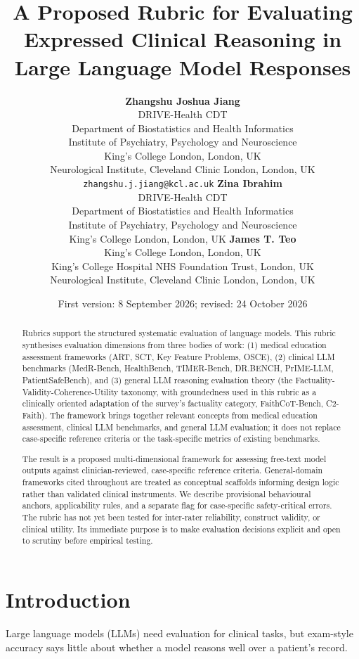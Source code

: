 \documentclass{article}
\title{A Proposed Rubric for Evaluating Expressed Clinical Reasoning in Large Language Model Responses}
\author{%
  {\normalfont\textbf{Zhangshu Joshua Jiang}}\\[-1pt]
  {\normalfont\small
  DRIVE-Health CDT\\
  Department of Biostatistics and Health Informatics\\
  Institute of Psychiatry, Psychology and Neuroscience\\
  King's College London, London, UK\\
  Neurological Institute, Cleveland Clinic London, London, UK\\
  \texttt{zhangshu.j.jiang@kcl.ac.uk}}
  \And
  {\normalfont\textbf{Zina Ibrahim}}\\[-1pt]
  {\normalfont\small
  DRIVE-Health CDT\\
  Department of Biostatistics and Health Informatics\\
  Institute of Psychiatry, Psychology and Neuroscience\\
  King's College London, London, UK}
  \And
  {\normalfont\textbf{James T. Teo}}\\[-1pt]
  {\normalfont\small
  King's College London, London, UK\\
  King's College Hospital NHS Foundation Trust, London, UK\\
  Neurological Institute, Cleveland Clinic London, London, UK}
}
\date{First version: 8 September 2026; revised: 24 October 2026}
\begin{document}
\maketitle

\begin{abstract}
Rubrics support the structured systematic evaluation of language models. This rubric synthesises evaluation dimensions from three bodies of work: (1) medical education assessment frameworks (ART, SCT, Key Feature Problems, OSCE), (2) clinical LLM benchmarks (MedR-Bench, HealthBench, TIMER-Bench, DR.BENCH, PrIME-LLM, PatientSafeBench), and (3) general LLM reasoning evaluation theory (the Factuality-Validity-Coherence-Utility taxonomy, with groundedness used in this rubric as a clinically oriented adaptation of the survey's factuality category, FaithCoT-Bench, C2-Faith). The framework brings together relevant concepts from medical education
assessment, clinical LLM benchmarks, and general LLM evaluation; it does not replace case-specific reference criteria or the task-specific metrics
of existing benchmarks.  

The result is a proposed multi-dimensional framework for assessing free-text
model outputs against clinician-reviewed, case-specific reference
criteria. General-domain frameworks cited throughout are treated as conceptual scaffolds informing design logic rather than validated clinical instruments. We describe provisional behavioural anchors,
applicability rules, and a separate flag for case-specific safety-critical
errors. The rubric has not yet been tested for inter-rater reliability,
construct validity, or clinical utility. Its immediate purpose is to
make evaluation decisions explicit and open to scrutiny before empirical
testing.
\end{abstract}



\section{Introduction}

Large language models (LLMs) need evaluation for clinical tasks, but exam-style accuracy says little about whether a model reasons well over a patient’s record. 
\end{document}
